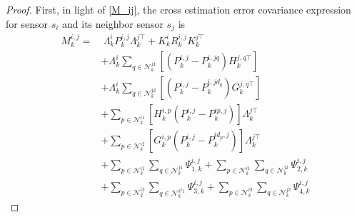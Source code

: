 \documentclass[twocolumn]{IEEEtran}
\begin{document}
\begin{proof}
First, in light of \eqref{M_ij}, the cross estimation error covariance expression for sensor $s_i$ and its neighbor sensor $s_j$ is
\begin{equation*}
\begin{split}
M_{k}^{i,j}
=&~\Lambda_{k}^{i}P_{k}^{i,j}\Lambda_{k}^{j\top}+K_{k}^{i}R_{k}^{i,j}K_{k}^{j\top}\\
&+\Lambda_{k}^{i}\sum_{q\in\mathcal{N}_{k}^{j1}}[(P_{k}^{i,j}-P_{k}^{i,jq})H_{k}^{j,q\top}]\\
&+\Lambda_{k}^{i}\sum_{q\in\mathcal{N}_{k}^{j2}}[(P_{k}^{i,j}-P_{k}^{i,jd_q})G_{k}^{j,q\top}]\\
&+\sum_{p\in\mathcal{N}_{k}^{i1}}[H_{k}^{i,p}(P_{k}^{i,j}-P_{k}^{ip,j})]\Lambda_{k}^{j\top}\\
&+\sum_{p\in\mathcal{N}_{k}^{i2}}[G_{k}^{i,p}(P_{k}^{i,j}-P_{k}^{id_ p,j})]\Lambda_{k}^{j\top}\\
&+\sum_{p\in\mathcal{N}_{k}^{i1}}\sum_{q\in\mathcal{N}_{k}^{j1}}\Psi_{1,k}^{i,j}+\sum_{p\in\mathcal{N}_{k}^{i1}}\sum_{q\in\mathcal{N}_{k}^{j2}}\Psi_{2,k}^{i,j}\\
&+\sum_{p\in\mathcal{N}_{k}^{i2}}\sum_{q\in\mathcal{N}_{k}^{{k}^j1}}\Psi_{3,k}^{i,j}+\sum_{p\in\mathcal{N}_{k}^{i2}}\sum_{q\in\mathcal{N}_{k}^{j2}}\Psi_{4,k}^{i,j}
\end{split}
\end{equation*}


\end{proof}
\end{document}

